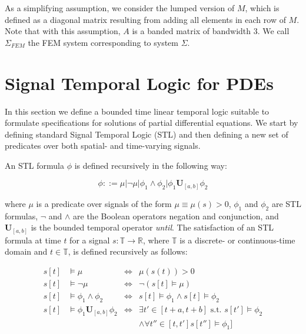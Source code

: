 \documentclass[oribibl]{llncs/llncs}
\newcommand*{\R}{\mathbb{R}}
\newcommand{\luntil}{\mathbf{U}}
\begin{document}
As a simplifying assumption, we consider the lumped version of $M$, which is
defined as a diagonal matrix resulting from adding all elements in each row of
$M$. Note that with this assumption, $A$ is a banded matrix of bandwidth 3. 
We call $\Sigma_{FEM}$ the FEM system corresponding to system $\Sigma$.


\section{Signal Temporal Logic for PDEs}
\label{sec:signal_temporal_logic}

In this section we define a bounded time linear temporal logic suitable to
formulate specifications for solutions of partial differential equations. We start
by defining standard Signal Temporal Logic (STL) and then defining a new set of
predicates over both spatial- and time-varying signals.

An STL formula $\phi$ is defined recursively in the following way:

\begin{equation}
    \phi ::= \mu | \lnot \mu | \phi_1 \land \phi_2 | \phi_1 \luntil_{[a,b]} \phi_2
\end{equation}

where $\mu$ is a predicate over signals of the form $\mu \equiv \mu(s) > 0$,
$\phi_1$ and $\phi_2$ are STL formulas,
$\lnot$ and $\land$ are the Boolean operators negation and conjunction, and
$\luntil_{[a, b]}$ is the bounded temporal operator \emph{until}. The satisfaction
of an STL formula at time $t$ for a signal $s :
\mathbb{T} \to \R$, where $\mathbb{T}$ is a discrete- or continuous-time domain
and $t \in \mathbb{T}$, is defined recursively as follows:

\begin{equation}
    \begin{aligned}
        s[t] &\models \mu &\iff &\mu(s(t)) > 0 \\
        s[t] &\models \lnot \mu &\iff &\lnot (s[t] \models \mu) \\
        s[t] &\models \phi_1 \land \phi_2 &\iff &s[t] \models \phi_1 \land s[t]
        \models \phi_2 \\
        s[t] &\models \phi_1 \luntil_{[a,b]} \phi_2 &\iff 
            &\exists t' \in [t+a, t+b] \text{ s.t. } s[t'] \models \phi_2 \\
        & & &\land \forall t'' \in [t, t'] s[t''] \models \phi_1]
    \end{aligned}
\end{equation}
\end{document}
